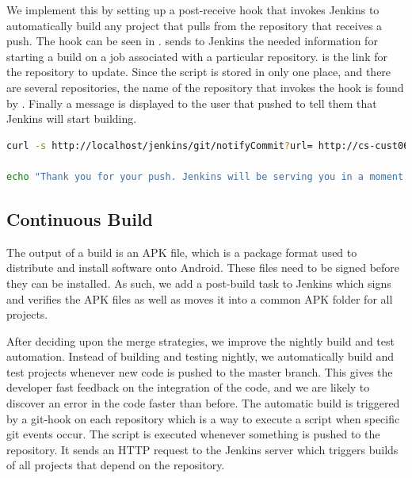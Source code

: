 We implement this by setting up a post-receive hook that invokes Jenkins to automatically build any project that pulls from the repository that receives a push. The hook can be seen in .  sends to Jenkins the needed information for starting a build on a job associated with a particular repository.  is the link for the repository to update. Since the script is stored in only one place, and there are several repositories, the name of the repository that invokes the hook is found by . Finally a message is displayed to the user that pushed to tell them that Jenkins will start building.

\begin{lstlisting}[language=bash,showstringspaces=false,caption=Git hook script,label=lst:hook_script_first]
curl -s http://localhost/jenkins/git/notifyCommit?url= http://cs-cust06-int.cs.aau.dk/git-ro/$(basename $(pwd)) > /dev/null

echo "Thank you for your push. Jenkins will be serving you in a moment."
\end{lstlisting}

\subsection{Continuous Build}
The output of a build is an APK file, which is a package format used to distribute and install software onto Android. These files need to be signed before they can be installed. As such, we add a post-build task to Jenkins which signs and verifies the APK files as well as moves it into a common APK folder for all projects.

After deciding upon the merge strategies, we improve the nightly build and test automation. Instead of building and testing nightly, we automatically build and test projects whenever new code is pushed to the master branch. This gives the developer fast feedback on the integration of the code, and we are likely to discover an error in the code faster than before. The automatic build is triggered by a git-hook on each repository which is a way to execute a script when specific git events occur. The script is executed whenever something is pushed to the repository. It sends an HTTP request to the Jenkins server which triggers builds of all projects that depend on the repository.


